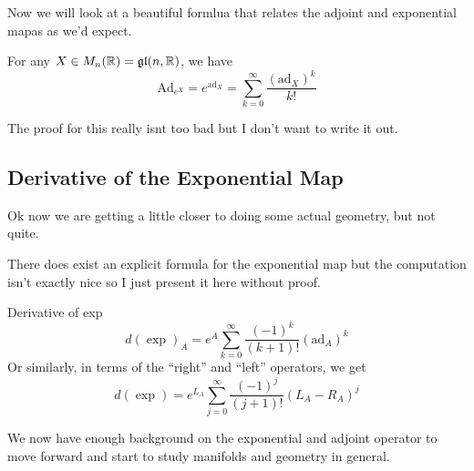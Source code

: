 Now we will look at a beautiful formlua that relates the adjoint and exponential
mapas as we'd expect.
\begin{boxprop}{}{}
    For any $X \in M_n(\mathbb{R}) = \mathfrak{gl}(n,\mathbb{R})$, we have
    \begin{equation*}
        \text{Ad}_{e^X} = e^{\text{ad}_X} = \sum_{k=0}^\infty \frac{(\text{ad}_X)^k}{k!}
    \end{equation*}
\end{boxprop}

The proof for this really isnt too bad but I don't want to write it out. 

\subsection{Derivative of the Exponential Map}
Ok now we are getting a little closer to doing some actual geometry, but not quite.

There does exist an explicit formula for the exponential map but the computation isn't
exactly nice so I just present it here without proof.

\begin{boxprop}{Derivative of exp}{}
    \begin{equation*}
        d(\exp)_A = e^A \sum_{k=0}^{\infty}\frac{(-1)^k}{(k+1)!}(\text{ad}_A)^k
    \end{equation*}
    Or similarly, in terms of the ``right'' and ``left'' operators, we get
    \begin{equation*}
        d(\exp) = e^{L_A}\sum_{j=0}^\infty \frac{(-1)^j}{(j+1)!}(L_A - R_A)^j
    \end{equation*}
\end{boxprop}


We now have enough background on the exponential and adjoint operator to move forward
and start to study manifolds and geometry in general.